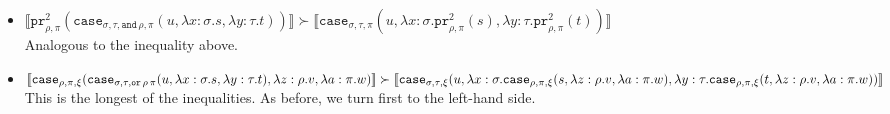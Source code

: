 \documentclass[a4paper,UKenglish,cleveref,autoref,numberwithinsect]{lipics-v2019}
\theoremstyle{definition}
\newcommand{\abs}[2]{\lambda #1.#2}
\newcommand{\interpret}[1]{\llbracket #1 \rrbracket}
\newcommand{\proj}{\mathtt{pr}}
\begin{document}
\begin{itemize}
\item $\interpret{\proj^2_{\rho,\pi}(\mathtt{case}_{\sigma,\tau,
  \mathtt{and}\,\rho,\pi}(u,\abs{x:\sigma}{s},\abs{y:\tau}{t}))}
  \succ \interpret{\mathtt{case}_{\sigma,\tau,\pi}(u,\abs{x:
  \sigma}{\proj^2_{\rho,\pi}(s)},\abs{y:\tau}{\proj^2_{\rho,\pi}(t)})}$ \\
  Analogous to the inequality above.

\item $\interpret{\mathtt{case}_{\rho,\pi,\xi}(\mathtt{case}_{\sigma,
  \tau,\mathtt{or}\,\rho\,\pi}(u,\abs{x:\sigma}{s},\abs{y:\tau}{t}),
  \abs{z:\rho}{v},\abs{a:\pi}{w})} \succ \\
  \interpret{\mathtt{case}_{\sigma,\tau,\xi}(u,\abs{x:\sigma}{
  \mathtt{case}_{\rho,\pi,\xi}(s,\abs{z:\rho}{v},\abs{a:\pi}{w})},
  \abs{y:\tau}{\mathtt{case}_{\rho,\pi,\xi}(t,\abs{z:\rho}{v},\abs{a:
  \pi}{w})})}$ \\
  This is the longest of the inequalities.  As before, we turn first
  to the left-hand side.


\end{itemize}
\end{document}
